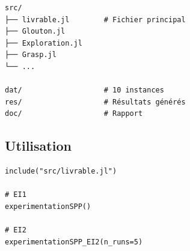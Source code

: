 \documentclass[11pt,a4paper]{article}
\begin{document}
\begin{verbatim}
src/
├── livrable.jl        # Fichier principal
├── Glouton.jl
├── Exploration.jl
├── Grasp.jl
└── ...

dat/                   # 10 instances
res/                   # Résultats générés
doc/                   # Rapport
\end{verbatim}

\subsection{Utilisation}

\begin{verbatim}
include("src/livrable.jl")

# EI1
experimentationSPP()

# EI2
experimentationSPP_EI2(n_runs=5)
\end{verbatim}
\end{document}
